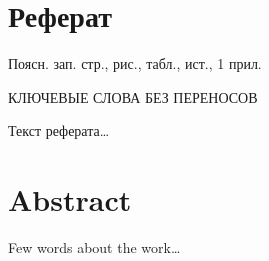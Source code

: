 \documentclass[../main]{subfiles}
\begin{document}
\newpage
{}
\section*{Реферат}

Поясн. зап.  стр.,   рис.,  табл.,  ист., 1 прил.\countcites

\begin{jje}
    \MakeUppercase{ключевые слова без переносов}
\end{jje}
Текст реферата\dots

\newpage
\section*{Abstract}
Few words about the work\dots
\end{document}
